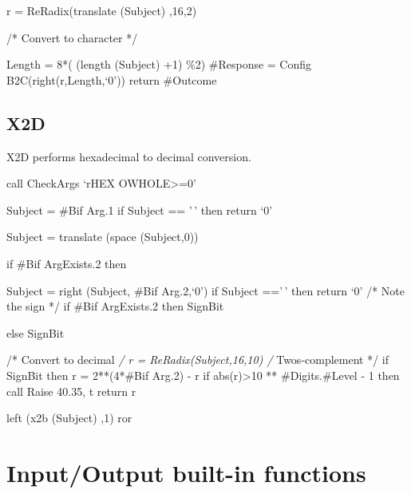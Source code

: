 r = ReRadix(translate (Subject) ,16,2)

/* Convert to character */

Length = 8*( (length (Subject) +1) \%2) \#Response = Config
B2C(right(r,Length,`0')) return \#Outcome

\hypertarget{x2d}{%
\subsection{X2D}\label{x2d}}

X2D performs hexadecimal to decimal conversion.

call CheckArgs `rHEX OWHOLE\textgreater=0'

Subject = \#Bif Arg.1 if Subject == '\,' then return `0'

Subject = translate (space (Subject,0))

if \#Bif ArgExists.2 then

Subject = right (Subject, \#Bif Arg.2,`0') if Subject =='\,' then return
`0' /* Note the sign */ if \#Bif ArgExists.2 then SignBit

else SignBit

/* Convert to decimal \emph{/ r = ReRadix(Subject,16,10) /}
Twos-complement */ if SignBit then r = 2**(4*\#Bif Arg.2) - r if
abs(r)\textgreater10 ** \#Digits.\#Level - 1 then call Raise 40.35, t
return r

left (x2b (Subject) ,1) ror

\hypertarget{inputoutput-built-in-functions}{%
\section{Input/Output built-in
functions}\label{inputoutput-built-in-functions}}

